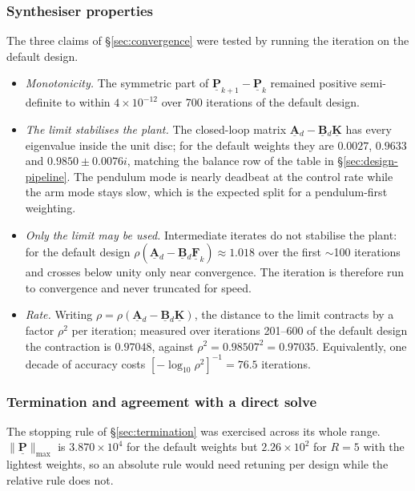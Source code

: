 \documentclass[12pt]{article}
\newcommand{\mb}[1]{\underline{\mathbf{#1}}}
\begin{document}
\subsubsection{Synthesiser properties}
\label{sec:solver-verification}

The three claims of \S\ref{sec:convergence} were tested by running the iteration on the default design.

\begin{itemize}
    \item \textit{Monotonicity.} The symmetric part of $\mb{P}_{k+1} - \mb{P}_k$ remained positive semi-definite to within $4 \times 10^{-12}$ over 700 iterations of the default design.
    \item \textit{The limit stabilises the plant.} The closed-loop matrix $\mb{A}{}_d - \mb{B}{}_d\mb{K}$ has every eigenvalue inside the unit disc; for the default weights they are $0.0027$, $0.9633$ and $0.9850 \pm 0.0076i$, matching the balance row of the table in \S\ref{sec:design-pipeline}. The pendulum mode is nearly deadbeat at the control rate while the arm mode stays slow, which is the expected split for a pendulum-first weighting.
    \item \textit{Only the limit may be used.} Intermediate iterates do not stabilise the plant: for the default design $\rho(\mb{A}{}_d - \mb{B}{}_d\mb{F}_k) \approx 1.018$ over the first $\sim$100 iterations and crosses below unity only near convergence. The iteration is therefore run to convergence and never truncated for speed.
    \item \textit{Rate.} Writing $\rho = \rho(\mb{A}{}_d - \mb{B}{}_d\mb{K})$, the distance to the limit contracts by a factor $\rho^2$ per iteration; measured over iterations 201--600 of the default design the contraction is $0.97048$, against $\rho^2 = 0.98507^2 = 0.97035$. Equivalently, one decade of accuracy costs $\left[-\log_{10}\rho^2\right]^{-1} = 76.5$ iterations.
\end{itemize}

\subsubsection{Termination and agreement with a direct solve}
\label{sec:termination-verification}

The stopping rule of \S\ref{sec:termination} was exercised across its whole range. $\|\mb{P}\|_{\max}$ is $3.870 \times 10^4$ for the default weights but $2.26 \times 10^2$ for $R = 5$ with the lightest weights, so an absolute rule would need retuning per design while the relative rule does not.
\end{document}
